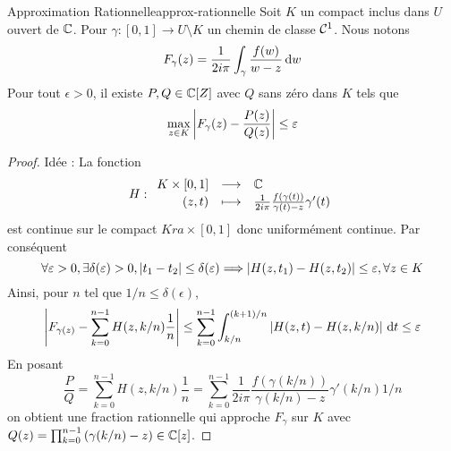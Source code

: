 \documentclass{cours}
\begin{document}
\begin{lemme}{Approximation Rationnelle}{approx-rationnelle}
    Soit $K$ un compact inclus dans $U$ ouvert de $\mathbb{C}$. Pour $\gamma : [0, 1] \to U \setminus K$ un chemin de classe $\mathcal{C}^{1}$. Nous notons 
    \[
        F_{\gamma}(z) = \frac{1}{2i\pi}\int_{\gamma}\frac{f(w)}{w-z}{\rm \, d} w
    \]
    Pour tout $\epsilon > 0$, il existe $P, Q \in \mathbb{C}[Z]$ avec $Q$ sans zéro dans $K$ tels que 
    \[
        \max_{z \in K} \left|F_{\gamma}(z) - \frac{P(z)}{Q(z)}\right| \leq \varepsilon
    \]
\end{lemme}
\begin{proof}
    Idée : La fonction 
    \[
        H : \begin{array}{rcl}
            K \times [0, 1] & \longrightarrow & \mathbb{C}\\
            (z, t) & \longmapsto & \frac{1}{2i\pi}\frac{f(\gamma(t))}{\gamma(t) - z}\gamma'(t)
        \end{array}
    \]
    est continue sur le compact $K ra\times [0, 1]$ donc uniformément continue. Par conséquent
    \[
        \forall \varepsilon > 0, \exists \delta(\varepsilon) > 0, \left|t_{1} - t_{2}\right| \leq \delta(\varepsilon) \Longrightarrow \left|H(z, t_{1}) - H(z, t_{2})\right| \leq \varepsilon, \forall z \in K
    \]
    Ainsi, pour $n$ tel que $1/n \leq \delta(\epsilon)$, 
    \[
        \left|F_{\gamma(z)} - \sum_{k = 0}^{n - 1} H(z, k/n)\frac{1}{n}\right| \leq \sum_{k = 0}^{n - 1}\int_{k/n}^{(k + 1)/n}\left|H(z, t) - H(z, k/n)\right|{\rm \, d} t \leq \varepsilon
    \]
    En posant 
    \[
        \frac{P}{Q} = \sum_{k = 0}^{n - 1}H(z, k/n)\frac{1}{n} = \sum_{k = 0}^{n - 1}\frac{1}{2i\pi}\frac{f(\gamma(k/n))}{\gamma(k/n) - z}\gamma'(k/n)1/n
    \]
    on obtient une fraction rationnelle qui approche $F_{\gamma}$ sur $K$ avec $Q(z) = \prod_{k = 0}^{n - 1}\left(\gamma(k/n) - z\right) \in \mathbb{C}[z]$.
\end{proof}
\end{document}

